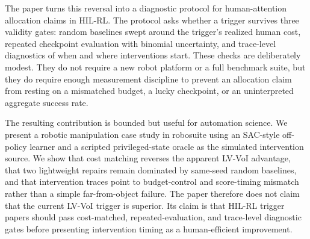 The paper turns this reversal into a diagnostic protocol for human-attention allocation claims in HIL-RL. The protocol asks whether a trigger survives three validity gates: random baselines swept around the trigger's realized human cost, repeated checkpoint evaluation with binomial uncertainty, and trace-level diagnostics of when and where interventions start. These checks are deliberately modest. They do not require a new robot platform or a full benchmark suite, but they do require enough measurement discipline to prevent an allocation claim from resting on a mismatched budget, a lucky checkpoint, or an uninterpreted aggregate success rate.

The resulting contribution is bounded but useful for automation science. We present a robotic manipulation case study in robosuite \cite{robosuite2020} using an SAC-style off-policy learner \cite{haarnoja2018sac,sac2018applications} and a scripted privileged-state oracle as the simulated intervention source. We show that cost matching reverses the apparent LV-VoI advantage, that two lightweight repairs remain dominated by same-seed random baselines, and that intervention traces point to budget-control and score-timing mismatch rather than a simple far-from-object failure. The paper therefore does not claim that the current LV-VoI trigger is superior. Its claim is that HIL-RL trigger papers should pass cost-matched, repeated-evaluation, and trace-level diagnostic gates before presenting intervention timing as a human-efficient improvement.
